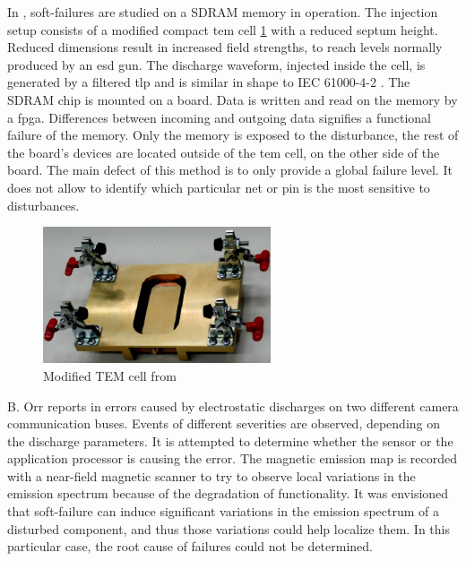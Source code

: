 In \cite{SDRAMCase}, soft-failures are studied on a SDRAM memory in operation.
The injection setup consists of a modified compact \gls{tem} cell \ref{fig:modified-tem-cell} with a reduced septum height.
Reduced dimensions result in increased field strengths, to reach levels normally produced by an \gls{esd} gun.
The discharge waveform, injected inside the cell, is generated by a filtered \gls{tlp} and is similar in shape to IEC 61000-4-2 \cite{iec61000-4-2}.
The SDRAM chip is mounted on a board.
Data is written and read on the memory by a \gls{fpga}.
Differences between incoming and outgoing data signifies a functional failure of the memory.
Only the memory is exposed to the disturbance, the rest of the board's devices are located outside of the \gls{tem} cell, on the other side of the board.
The main defect of this method is to only provide a global failure level.
It does not allow to identify which particular net or pin is the most sensitive to disturbances.

\begin{figure}[!h]
  \centering
  \includegraphics[width=0.6\textwidth]{src/1/figures/modified_tem_cell.png}
  \caption{Modified TEM cell from \cite{SDRAMCase}}
  \label{fig:modified-tem-cell}
\end{figure}

B. Orr reports in \cite{softFailSubsystem} errors caused by electrostatic discharges on two different camera communication buses.
Events of different severities are observed, depending on the discharge parameters.
It is attempted to determine whether the sensor or the application processor is causing the error.
The magnetic emission map is recorded with a near-field magnetic scanner to try to observe local variations in the emission spectrum because of the degradation of functionality.
It was envisioned that soft-failure can induce significant variations in the emission spectrum of a disturbed component, and thus those variations could help localize them.
In this particular case, the root cause of failures could not be determined.

